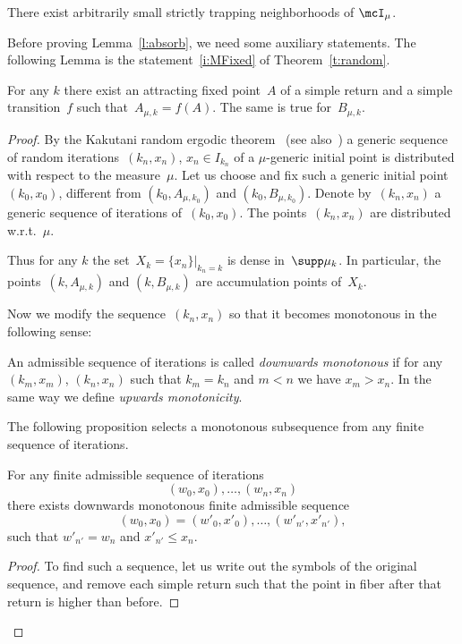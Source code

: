 \documentclass[a4paper,12pt]{amsart}
\begin{document}
\begin{Lem}   \label{l:absorb}
There exist arbitrarily small strictly trapping neighborhoods of $\mcI_\mu$.
\end{Lem}

Before proving Lemma~\ref{l:absorb}, we need some auxiliary statements. The following Lemma is the statement~\ref{i:MFixed} of Theorem~\ref{t:random}.

\begin{Lem} \label{l:MFixed}
For any $k$ there exist an attracting fixed point~$A$ of a simple return and a simple transition~$f$ such that~$A_{\mu,k} = f (A)$.
The same is true for~$B_{\mu,k}$.
\end{Lem}

\begin{proof}
By the Kakutani random ergodic theorem~\cite{Kakutani1951} (see also~\cite{Furman2002}) a generic sequence of random iterations~$(k_n, x_n)$, $x_n \in I_{k_n}$ of a $\mu$-generic initial point is distributed with respect to the measure~$\mu$. Let us choose and fix such a generic initial point~$(k_0,x_0)$, different from $(k_0, A_{\mu,k_0})$ and $(k_0,B_{\mu,k_0})$. Denote by~$(k_n,x_n)$ a generic sequence of iterations of~$(k_0,x_0)$. The points~$(k_n,x_n)$ are distributed w.r.t.~$\mu$.

Thus for any $k$ the set~$X_k = \{x_n\}|_{k_n=k}$ is dense in~$\supp \mu_k$. In particular, the points~$(k,A_{\mu,k})$ and $(k,B_{\mu,k})$ are accumulation points of~$X_k$.

Now we modify the sequence~$(k_n,x_n)$ so that it becomes monotonous in the following sense:

\begin{Def}
An admissible sequence of iterations is called \emph{downwards monotonous} if for any $(k_m,x_m)$, $(k_n,x_n)$ such that $k_m = k_n$ and $m < n$ we have $x_m > x_n$. In the same way we define \emph{upwards monotonicity}.
\end{Def}

The following proposition selects a monotonous subsequence from any finite sequence of iterations.

\begin{Prop}\label{p:downwards}
For any finite admissible sequence of iterations
$$
(w_0,x_0),\dots,(w_n,x_n)
$$
there exists downwards monotonous finite admissible sequence
$$
(w_0,x_0)=(w'_0,x'_0),\dots,(w'_{n'},x'_{n'}),
$$
such that $w'_{n'} = w_n$ and $x'_{n'} \le x_n$.
\end{Prop}
\begin{proof}
To find such a sequence, let us write out the symbols of the original sequence, and remove each simple return such that the point in fiber after that return is higher than before.


\end{proof}
\end{proof}
\end{document}
